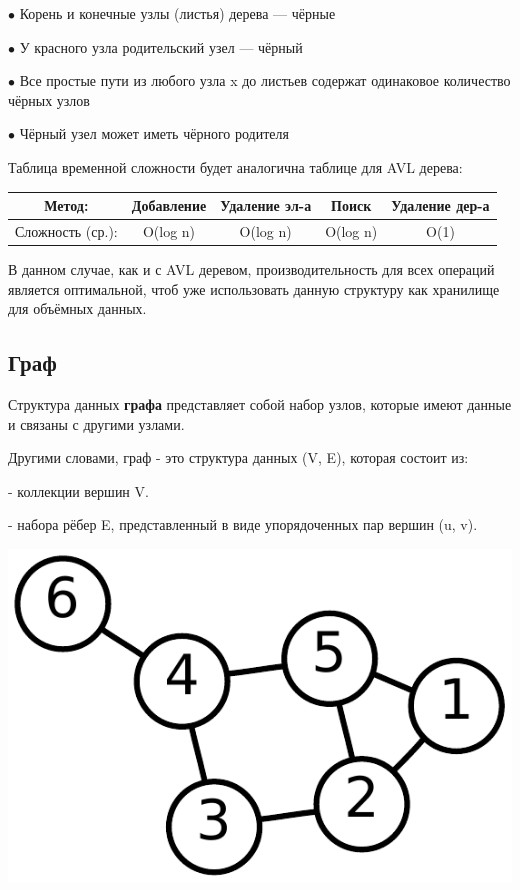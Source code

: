 \documentclass[utf8,14pt,a4paper,oneside,russian]{book}
\begin{document}
	$\bullet$ Корень и конечные узлы (листья) дерева — чёрные
	
	$\bullet$ У красного узла родительский узел — чёрный
	
	$\bullet$ Все простые пути из любого узла x до листьев содержат одинаковое количество чёрных узлов
	
	$\bullet$ Чёрный узел может иметь чёрного родителя
	
	Таблица временной сложности будет аналогична таблице для AVL дерева:
	
	\begin{longtable}{c|c|c|c|c}
		Метод: &Добавление&Удаление эл-а&Поиск&Удаление дер-а\\\hline
		Сложность (ср.): &O(log n)&O(log n)&O(log n)&O(1)\\
	\end{longtable}

	В данном случае, как и с AVL деревом, производительность для всех операций является оптимальной, чтоб уже использовать данную структуру как хранилище для объёмных данных.
	
	\subsection{Граф}
	
	Структура данных \textbf{графа} представляет собой набор узлов, которые имеют данные и связаны с другими узлами.
	
	Другими словами, граф - это структура данных (V, E), которая состоит из:
	
	- коллекции вершин V.
	
	- набора рёбер E, представленный в виде упорядоченных пар вершин (u, v).
	
	\begin{center}
		\includegraphics[scale=0.7]{graf}\\
	\end{center}
	
\end{document}
